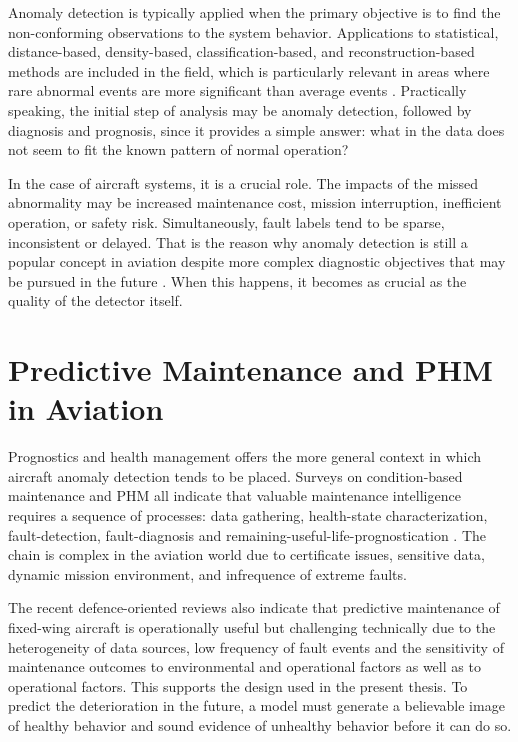 \documentclass[12pt,a4paper]{report}
\begin{document}
	Anomaly detection is typically applied when the primary objective is to find the non-conforming observations to the system behavior. Applications to statistical, distance-based, density-based, classification-based, and reconstruction-based methods are included in the field, which is particularly relevant in areas where rare abnormal events are more significant than average events \cite{chandola2009survey,zimek2012outlier,nassif2021systematic}. Practically speaking, the initial step of analysis may be anomaly detection, followed by diagnosis and prognosis, since it provides a simple answer: what in the data does not seem to fit the known pattern of normal operation?
	
	In the case of aircraft systems, it is a crucial role. The impacts of the missed abnormality may be increased maintenance cost, mission interruption, inefficient operation, or safety risk. Simultaneously, fault labels tend to be sparse, inconsistent or delayed. That is the reason why anomaly detection is still a popular concept in aviation despite more complex diagnostic objectives that may be pursued in the future \cite{basora2019aviation,demir2024aiaviation}. When this happens, it becomes as crucial as the quality of the detector itself.
	
	\section{Predictive Maintenance and PHM in Aviation}
	
	Prognostics and health management offers the more general context in which aircraft anomaly detection tends to be placed. Surveys on condition-based maintenance and PHM all indicate that valuable maintenance intelligence requires a sequence of processes: data gathering, health-state characterization, fault-detection, fault-diagnosis and remaining-useful-life-prognostication \cite{jardine2006cbm,peng2010prognostics,si2011rul}. The chain is complex in the aviation world due to certificate issues, sensitive data, dynamic mission environment, and infrequence of extreme faults.
	
	The recent defence-oriented reviews also indicate that predictive maintenance of fixed-wing aircraft is operationally useful but challenging technically due to the heterogeneity of data sources, low frequency of fault events and the sensitivity of maintenance outcomes to environmental and operational factors as well as to operational factors. This supports the design used in the present thesis. To predict the deterioration in the future, a model must generate a believable image of healthy behavior and sound evidence of unhealthy behavior before it can do so.
	
\end{document}
